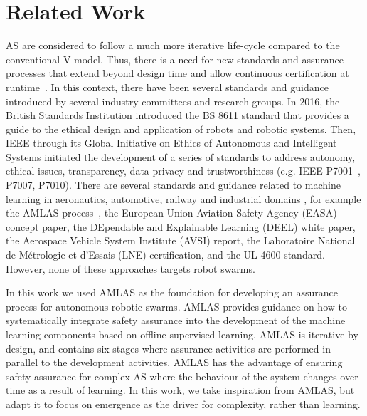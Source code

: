 \documentclass[runningheads]{llncs}
\begin{document}
\section{Related Work}\label{relatedwork}%
AS are considered to follow a much more iterative life-cycle compared to the conventional V-model. 
Thus, there is a need for new standards and assurance processes that extend beyond design time and allow continuous certification at runtime~\cite{Rushby2008}. 
In this context, there have been several standards and guidance introduced by several industry committees and research groups. In 2016, the British Standards Institution introduced the BS 8611 standard that provides a guide to the ethical design and application of robots and robotic systems. %
Then, IEEE through its Global Initiative on Ethics of Autonomous and Intelligent Systems initiated the development of a series of standards to address autonomy, ethical issues, transparency, data privacy and trustworthiness (e.g. IEEE P7001~\cite{IEEE-P7001}, P7007, P7010). 
There are several standards and guidance related to machine learning in aeronautics, automotive, railway and industrial domains \cite{Kaakai2022}, for example the AMLAS process~\cite{Hawkins2021}, the European Union Aviation Safety Agency (EASA) concept paper, the DEpendable and Explainable Learning (DEEL) white paper, the Aerospace Vehicle System Institute (AVSI) report, the Laboratoire National de Métrologie et d'Essais (LNE) certification, and the UL 4600 standard. However, none of these approaches targets robot swarms. %

In this work we used AMLAS \cite{Hawkins2021} as the foundation for developing an assurance process for autonomous robotic swarms. 
AMLAS provides guidance on how to systematically integrate safety assurance into the development of the machine learning components based on offline supervised learning. 
AMLAS is iterative by design, and contains six stages where assurance activities are performed in parallel to the development activities. 
AMLAS has the advantage of ensuring safety assurance for complex AS where the behaviour of the system changes over time as a result of learning. 
In this work, we take inspiration from AMLAS, but adapt it to focus on emergence as the driver for complexity, rather than learning. 
\end{document}
